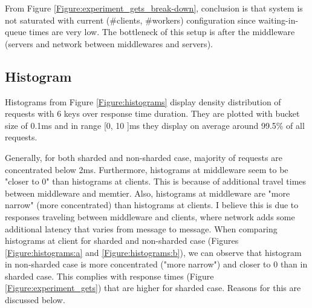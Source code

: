 \documentclass[11pt,a4paper]{article}
\begin{document}
From Figure \ref{Figure:experiment_gets_break-down}, conclusion is that system is not saturated with current (\#clients, \#workers) configuration since waiting-in-queue times are very low. The bottleneck of this setup is after the middleware (servers and network between middlewares and servers).

\subsection{Histogram}

Histograms from Figure \ref{Figure:histograms} display density distribution of requests with 6 keys over response time duration. They are plotted with bucket size of 0.1ms and in range [0, 10 ]ms they display on average around 99.5\% of all requests.

Generally, for both sharded and non-sharded case, majority of requests are concentrated below 2ms. Furthermore, histograms at middleware seem to be "closer to 0" than histograms at clients. This is because of additional travel times between middleware and memtier. Also, histograms at middleware are "more narrow" (more concentrated) than histograms at clients. I believe this is due to responses traveling between middleware and clients, where network adds some additional latency that varies from message to message. When comparing histograms at client for sharded and non-sharded case (Figures \ref{Figure:histograms:a} and \ref{Figure:histograms:b}), we can observe that histogram in non-sharded case is more concentrated ("more narrow") and closer to 0 than in sharded case. This complies with response times (Figure \ref{Figure:experiment_gets}) that are higher for sharded case. Reasons for this are discussed below.
\end{document}
